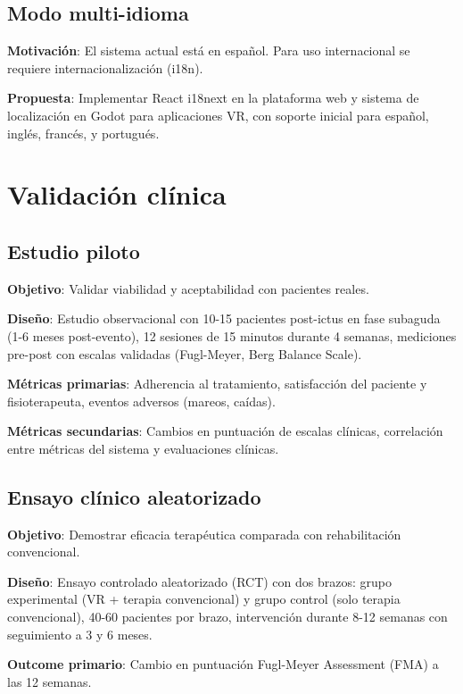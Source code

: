 \subsection{Modo multi-idioma}

\textbf{Motivación}: El sistema actual está en español. Para uso internacional se requiere internacionalización (i18n).

\textbf{Propuesta}: Implementar React i18next en la plataforma web y sistema de localización en Godot para aplicaciones VR, con soporte inicial para español, inglés, francés, y portugués.

\section{Validación clínica}

\subsection{Estudio piloto}

\textbf{Objetivo}: Validar viabilidad y aceptabilidad con pacientes reales.

\textbf{Diseño}: Estudio observacional con 10-15 pacientes post-ictus en fase subaguda (1-6 meses post-evento), 12 sesiones de 15 minutos durante 4 semanas, mediciones pre-post con escalas validadas (Fugl-Meyer, Berg Balance Scale).

\textbf{Métricas primarias}: Adherencia al tratamiento, satisfacción del paciente y fisioterapeuta, eventos adversos (mareos, caídas).

\textbf{Métricas secundarias}: Cambios en puntuación de escalas clínicas, correlación entre métricas del sistema y evaluaciones clínicas.

\subsection{Ensayo clínico aleatorizado}

\textbf{Objetivo}: Demostrar eficacia terapéutica comparada con rehabilitación convencional.

\textbf{Diseño}: Ensayo controlado aleatorizado (RCT) con dos brazos: grupo experimental (VR + terapia convencional) y grupo control (solo terapia convencional), 40-60 pacientes por brazo, intervención durante 8-12 semanas con seguimiento a 3 y 6 meses.

\textbf{Outcome primario}: Cambio en puntuación Fugl-Meyer Assessment (FMA) a las 12 semanas.

